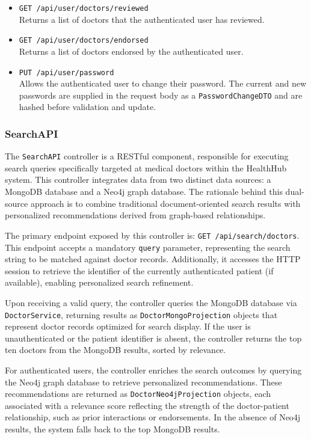 \begin{itemize}
	\item \texttt{GET /api/user/doctors/reviewed} \\
	Returns a list of doctors that the authenticated user has reviewed.
	
	\item \texttt{GET /api/user/doctors/endorsed} \\
	Returns a list of doctors endorsed by the authenticated user.
	
	\item \texttt{PUT /api/user/password} \\
	Allows the authenticated user to change their password. The current and new passwords are supplied in the request body as a \texttt{PasswordChangeDTO} and are hashed before validation and update.
\end{itemize}

\subsubsection{SearchAPI}
The \texttt{SearchAPI} controller is a RESTful component, responsible for executing search queries specifically targeted at medical doctors within the HealthHub system. This controller integrates data from two distinct data sources: a MongoDB database and a Neo4j graph database. The rationale behind this dual-source approach is to combine traditional document-oriented search results with personalized recommendations derived from graph-based relationships. 

The primary endpoint exposed by this controller is: \texttt{GET /api/search/doctors}.  
This endpoint accepts a mandatory \texttt{query} parameter, representing the search string to be matched against doctor records. Additionally, it accesses the HTTP session to retrieve the identifier of the currently authenticated patient (if available), enabling personalized search refinement. 

Upon receiving a valid query, the controller queries the MongoDB database via \texttt{DoctorService}, returning results as \texttt{DoctorMongoProjection} objects that represent doctor records optimized for search display. If the user is unauthenticated or the patient identifier is absent, the controller returns the top ten doctors from the MongoDB results, sorted by relevance.

For authenticated users, the controller enriches the search outcomes by querying the Neo4j graph database to retrieve personalized recommendations. These recommendations are returned as \texttt{DoctorNeo4jProjection} objects, each associated with a relevance score reflecting the strength of the doctor-patient relationship, such as prior interactions or endorsements. In the absence of Neo4j results, the system falls back to the top MongoDB results.

